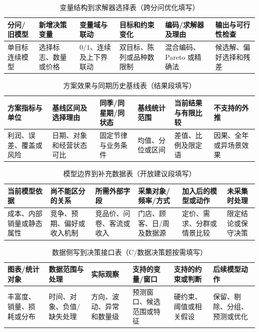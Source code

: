 \documentclass[withoutpreface,bwprint]{cumcmthesis}
\begin{document}
  \begin{table}[H]
    \centering
    \small
    \setlength{\tabcolsep}{3.2pt}
    \caption{变量结构到求解器选择表（跨分问优化填写）}
    \label{tab:variable-structure-solver-guide}
    \begin{tabular}{p{2.0cm}p{2.1cm}p{2.2cm}p{2.35cm}p{2.25cm}p{2.2cm}}
      \toprule
      分问/旧模型 & 新增决策变量 & 变量域与联动 & 目标和约束变化 & 编码/求解器及理由 & 输出与可行性检查 \\
      \midrule
      单目标连续模型 & 选择标志、数量或价格 & $0/1$、连续及上下界联动 & 双目标、陈列或品种数限制 & 混合编码、Pareto 或精确法 & 候选解、偏好选择和残差 \\
      \bottomrule
    \end{tabular}
  \end{table}
  \begin{table}[H]
    \centering
    \small
    \setlength{\tabcolsep}{3.2pt}
    \caption{方案效果与同期历史基线表（结果段填写）}
    \label{tab:historical-baseline-comparison-guide}
    \begin{tabular}{p{2.15cm}p{2.2cm}p{2.1cm}p{2.25cm}p{2.3cm}p{2.05cm}}
      \toprule
      方案指标与单位 & 基线区间及选择理由 & 同季/同星期/同状态 & 基线统计范围 & 当前结果与有限比较 & 不支持的外推 \\
      \midrule
      利润、误差、覆盖或风险 & 日期、对象和经营状态可比 & 固定节律与业务条件 & 均值、分位或区间 & 差值、比例及限定语 & 因果、全年或异场景效果 \\
      \bottomrule
    \end{tabular}
  \end{table}
  \begin{table}[H]
    \centering
    \small
    \setlength{\tabcolsep}{3.2pt}
    \caption{模型边界到补充数据表（开放建议段填写）}
    \label{tab:model-boundary-data-gap-guide}
    \begin{tabular}{p{2.1cm}p{2.25cm}p{2.3cm}p{2.25cm}p{2.25cm}p{1.9cm}}
      \toprule
      当前模型依据 & 尚不能区分的关系 & 所需外部字段 & 采集对象/频率/方式 & 加入后的模型或动作 & 未采集时处理 \\
      \midrule
      成本、内部销量或静态属性 & 竞争、预期、偏好或收入机制 & 竞品价、问卷、客流或收入 & 门店、顾客、日/周及数据源 & 定价、需求、分群或情景比较 & 限定结论或保守决策 \\
      \bottomrule
    \end{tabular}
  \end{table}
  \begin{table}[H]
    \centering
    \small
    \setlength{\tabcolsep}{3.5pt}
    \caption{数据侧写到决策接口表（C/数据决策题按需填写）}
    \label{tab:data-profile-decision-interface-guide}
    \begin{tabular}{p{1.75cm}p{2.2cm}p{2.2cm}p{2.25cm}p{2.25cm}p{2.0cm}}
      \toprule
      图表/统计对象 & 数据范围与处理 & 实际观察 & 支持的变量/窗口 & 支持的约束或判断 & 后续模型动作 \\
      \midrule
      丰富度、销量、损耗或分布 & 时间、对象、负值/缺失处理 & 方向、波动、异常和数量级 & 预测窗口、候选范围或特征 & 硬约束、阈值或相关假设 & 保留、剔除、分组、预测或优化 \\
      \bottomrule
    \end{tabular}
  \end{table}
\end{document}
